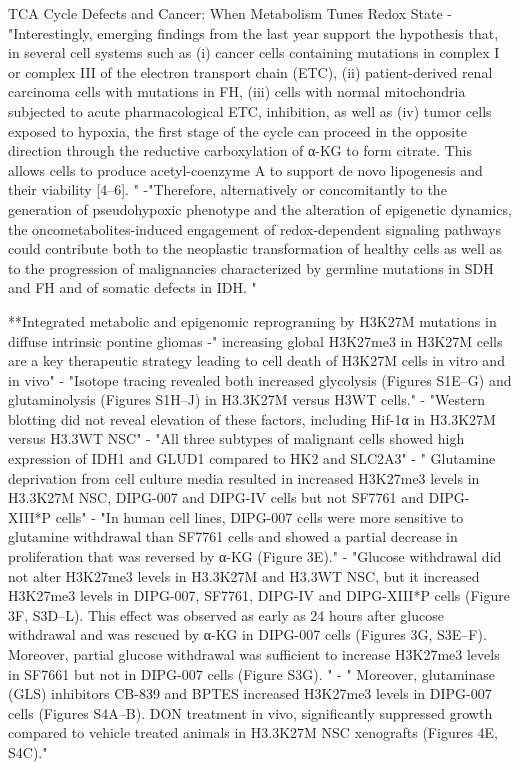 \documentclass[11pt,a4paper]{article}
\begin{document}
TCA Cycle Defects and Cancer: When Metabolism Tunes Redox State
-"Interestingly, emerging findings from the last year support the hypothesis that, in several cell systems such as (i) cancer cells containing mutations in complex I or complex III of the electron transport chain (ETC), (ii) patient-derived renal carcinoma cells with mutations in FH, (iii) cells with normal mitochondria subjected to acute pharmacological ETC, inhibition, as well as (iv) tumor cells exposed to hypoxia, the first stage of the cycle can proceed in the opposite direction through the reductive carboxylation of α-KG to form citrate. This allows cells to produce acetyl-coenzyme A to support de novo lipogenesis and their viability [4–6]. "
-"Therefore, alternatively or concomitantly to the generation of pseudohypoxic phenotype and the alteration of epigenetic dynamics, the oncometabolites-induced engagement of redox-dependent signaling pathways could contribute both to the neoplastic transformation of healthy cells as well as to the progression of malignancies characterized by germline mutations in SDH and FH and of somatic defects in IDH. "

**Integrated metabolic and epigenomic reprograming by H3K27M mutations in diffuse intrinsic pontine gliomas
-" increasing global H3K27me3 in H3K27M cells are a key therapeutic strategy leading to cell death of H3K27M cells in vitro and in vivo"
- "Isotope tracing revealed both increased glycolysis (Figures S1E–G) and glutaminolysis (Figures S1H–J) in H3.3K27M versus H3WT cells."
- "Western blotting did not reveal elevation of these factors, including Hif-1α in H3.3K27M versus H3.3WT NSC"
- "All three subtypes of malignant cells showed high expression of IDH1 and GLUD1 compared to HK2 and SLC2A3"
- " Glutamine deprivation from cell culture media resulted in increased H3K27me3 levels in H3.3K27M NSC, DIPG-007 and DIPG-IV cells but not SF7761 and DIPG-XIII*P cells"
- "In human cell lines, DIPG-007 cells were more sensitive to glutamine withdrawal than SF7761 cells and showed a partial decrease in proliferation that was reversed by α-KG (Figure 3E)."
 - "Glucose withdrawal did not alter H3K27me3 levels in H3.3K27M and H3.3WT NSC, but it increased H3K27me3 levels in DIPG-007, SF7761, DIPG-IV and DIPG-XIII*P cells (Figure 3F, S3D–L). This effect was observed as early as 24 hours after glucose withdrawal and was rescued by α-KG in DIPG-007 cells (Figures 3G, S3E–F). Moreover, partial glucose withdrawal was sufficient to increase H3K27me3 levels in SF7661 but not in DIPG-007 cells (Figure S3G). "
 - " Moreover, glutaminase (GLS) inhibitors CB-839 and BPTES increased H3K27me3 levels in DIPG-007 cells (Figures S4A–B). DON treatment in vivo, significantly suppressed growth compared to vehicle treated animals in H3.3K27M NSC xenografts (Figures 4E, S4C)."
 
\end{document}
